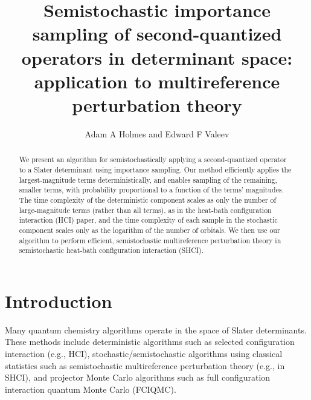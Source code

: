 \documentclass[english]{article}
\title{Semistochastic importance sampling of second-quantized operators in determinant space: application to multireference perturbation theory}
\author{Adam A Holmes and Edward F Valeev}
\begin{document}
\maketitle

\begin{abstract}
We present an algorithm for semistochastically applying a second-quantized operator to a Slater determinant using importance sampling. Our method efficiently applies the largest-magnitude terms deterministically, and enables sampling of the remaining, smaller terms, with probability proportional to a function of the terms' magnitudes. The time complexity of the deterministic component scales as only the number of large-magnitude terms (rather than all terms), as in the heat-bath configuration interaction (HCI) paper, and the time complexity of each sample in the stochastic component scales only as the logarithm of the number of orbitals. We then use our algorithm to perform efficient, semistochastic multireference perturbation theory in semistochastic heat-bath configuration interaction (SHCI).
\end{abstract}

\section{Introduction}
Many quantum chemistry algorithms operate in the space of Slater determinants. These methods include deterministic algorithms such as selected configuration interaction (e.g., HCI), stochastic/semistochastic algorithms using classical statistics such as semistochastic multireference perturbation theory (e.g., in SHCI), and projector Monte Carlo algorithms such as full configuration interaction quantum Monte Carlo (FCIQMC).
\end{document}
